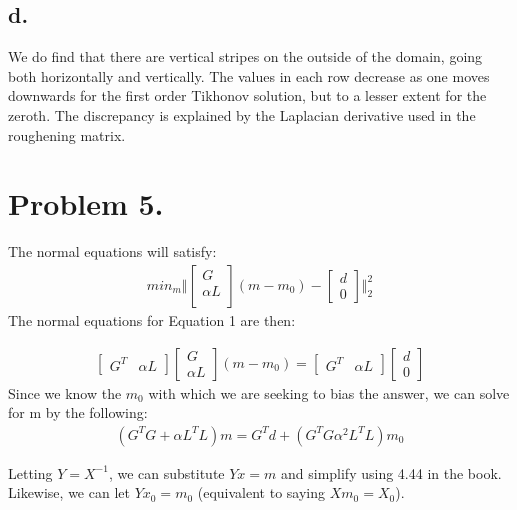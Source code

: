 \documentclass{article}
\begin{document}
\FloatBarrier
\vspace{-20pt}
\subsection*{d.}
We do find that there are vertical stripes on the outside of the domain, going both horizontally and vertically. The values in each row decrease as one moves downwards for the first order Tikhonov solution, but to a lesser extent for the zeroth. The discrepancy is explained by the Laplacian derivative used in the roughening matrix. 



\newpage
\section*{Problem 5.}
The normal equations will satisfy:
\begin{align}
min_m
\Bigg\Vert
\begin{bmatrix}
G \\
\alpha L \\ 
\end{bmatrix}
(m - m_0)
-
\begin{bmatrix}
d \\
0 
\end{bmatrix}
\Bigg\Vert_2^{2}
\end{align}
The normal equations for Equation 1 are then: 

\begin{align}
\begin{bmatrix}
G^T & \alpha L 
\end{bmatrix}
\begin{bmatrix}
G \\
\alpha L 
\end{bmatrix}
(m - m_0)
=
\begin{bmatrix}
G^T & \alpha L 
\end{bmatrix}
\begin{bmatrix}
d \\
0
\end{bmatrix}
\end{align}
Since we know the $m_0$ with which we are seeking to bias the answer, we can solve for m by the following: 
\begin{align}
(G^TG + \alpha L^TL)m = G^Td + (G^TG\alpha^2L^TL)m_0
\end{align}

Letting $Y=X^{-1}$, we can substitute $Yx=m$ and simplify using 4.44 in the book. Likewise, we can let $Yx_0=m_0$ (equivalent to saying $Xm_0 = X_0$). 
\end{document}
